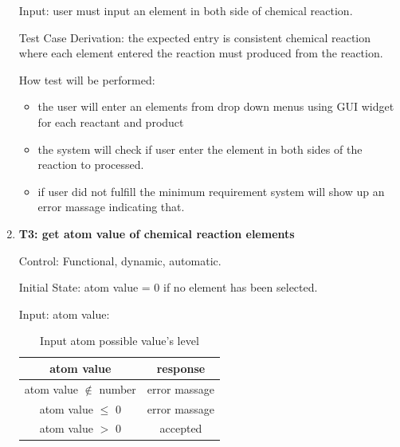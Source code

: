 \documentclass[12pt, titlepage]{article}
\begin{document}
\begin{enumerate}
Input: user must input an element in both side of chemical reaction.

\begin{table}[h!]
\centering
{}
\caption{Input name of element possible entries and its corresponding outputs }
\label{elementname}
\end{table}

Test Case Derivation: the expected entry is consistent chemical reaction where each element entered the reaction must produced from the reaction. 

How test will be performed: 
\begin{itemize}
\item the user will enter an elements from drop down menus using GUI widget for each reactant and product
\item the system will check if user enter the element in both sides of the reaction to processed. 
\item if user did not fulfill the minimum requirement system will show up an error massage indicating that. 
\end{itemize}

\item{\bf T3: get atom value of chemical reaction elements \\}

Control: Functional, dynamic, automatic.
					
Initial State: atom value = 0 if no element has been selected.
					
Input: 
atom value: 
\begin{table}[h!]
\centering
\begin{tabular}{|c|c|}
\hline
atom value & response  \\
\hline
atom value $\notin$ number  & error massage \\ \hline
atom value $\leq$ 0& error massage \\ \hline
atom value $>$ 0  & accepted\\ \hline
\hline
\end{tabular}
\caption{Input atom possible value's level}
\label{atom}
\end{table}
	

\end{enumerate}
\end{document}
